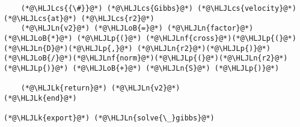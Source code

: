\documentclass[12pt,a4paper]{article}
\newcommand{\HLJLk}[1]{\textcolor[RGB]{148,91,176}{\textbf{#1}}}
\newcommand{\HLJLn}[1]{#1}
\newcommand{\HLJLnf}[1]{\textcolor[RGB]{66,102,213}{#1}}
\newcommand{\HLJLoB}[1]{\textcolor[RGB]{102,102,102}{\textbf{#1}}}
\newcommand{\HLJLp}[1]{#1}
\newcommand{\HLJLcs}[1]{\textcolor[RGB]{153,153,119}{\textit{#1}}}
\begin{document}
\begin{lstlisting}
	(*@\HLJLcs{{\#}}@*) (*@\HLJLcs{Gibbs}@*) (*@\HLJLcs{velocity}@*) (*@\HLJLcs{at}@*) (*@\HLJLcs{r2}@*)
	(*@\HLJLn{v2}@*) (*@\HLJLoB{=}@*) (*@\HLJLn{factor}@*) (*@\HLJLoB{*}@*) (*@\HLJLp{(}@*) (*@\HLJLnf{cross}@*)(*@\HLJLp{(}@*)(*@\HLJLn{D}@*)(*@\HLJLp{,}@*) (*@\HLJLn{r2}@*)(*@\HLJLp{)}@*)(*@\HLJLoB{/}@*)(*@\HLJLnf{norm}@*)(*@\HLJLp{(}@*)(*@\HLJLn{r2}@*)(*@\HLJLp{)}@*) (*@\HLJLoB{+}@*) (*@\HLJLn{S}@*) (*@\HLJLp{)}@*)

	(*@\HLJLk{return}@*) (*@\HLJLn{v2}@*)
(*@\HLJLk{end}@*)

(*@\HLJLk{export}@*) (*@\HLJLn{solve{\_}gibbs}@*)
\end{lstlisting}
\end{document}
